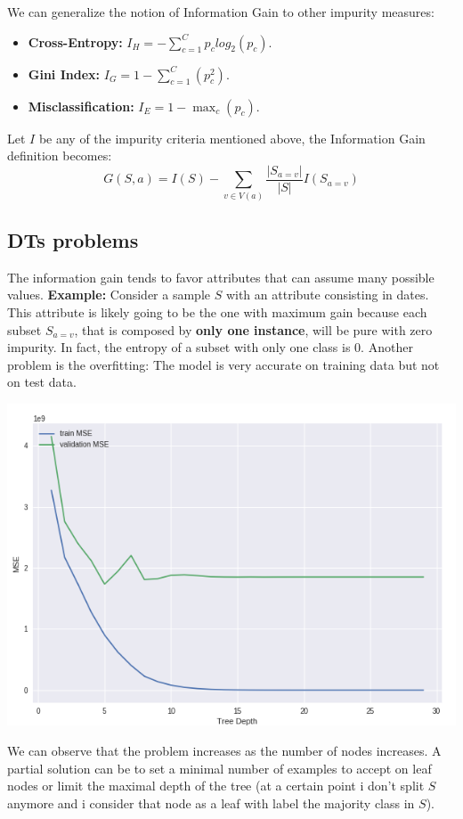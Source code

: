 We can generalize the notion of Information Gain to other impurity measures:
\begin{itemize}
    \item \textbf{Cross-Entropy:} $I_{H} = -\sum_{c=1}^{C}p_{c}log_{2}(p_{c})$.
    \item \textbf{Gini Index:} $I_{G} = 1 - \sum_{c=1}^{C}(p_{c}^{2})$.
    \item \textbf{Misclassification:} $I_{E} = 1 - \max_{c}(p_{c})$.
\end{itemize}
Let $I$ be any of the impurity criteria mentioned above, the Information Gain definition becomes:
\[G(S,a) = I(S) - \sum_{v \in V(a)}\frac{|S_{a=v}|}{|S|}I(S_{a=v})\]
\subsection{DTs problems}
The information gain tends to favor attributes that can assume many possible values. \newline
\textbf{Example:} Consider a sample $S$ with an attribute consisting in dates. This attribute is likely going to be the one with maximum gain because each subset $S_{a=v}$, that is composed by \textbf{only one instance}, will be pure with zero impurity. In fact, the entropy of a subset with only one class is 0. \newline \newline
Another problem is the overfitting: The model is very accurate on training data but not on test data. 
\begin{center}
    \includegraphics[scale=0.4]{images/overfitting dts.png}
\end{center}
We can observe that the problem increases as the number of nodes increases. A partial solution can be to set a minimal number of examples to accept on leaf nodes or limit the maximal depth of the tree (at a certain point i don't split $S$ anymore and i consider that node as a leaf with label the majority class in $S$).
